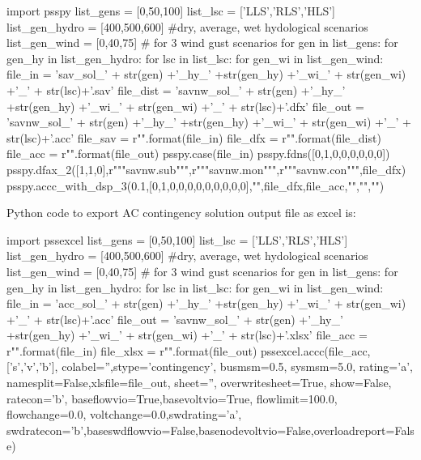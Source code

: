 \documentclass[10pt]{report}
\begin{document}
\begin{python}
import psspy
list_gens = [0,50,100]
list_lsc = ['LLS','RLS','HLS']
list_gen_hydro = [400,500,600] #dry, average, wet hydological scenarios
list_gen_wind = [0,40,75] # for 3 wind gust scenarios
for gen in list_gens:
    for gen_hy in list_gen_hydro:
        for lsc in list_lsc:
            for gen_wi in list_gen_wind:
                file_in = 'sav\savnw_sol_' + str(gen) +'_hy_' +str(gen_hy) +'_wi_' + str(gen_wi) +'_' + str(lsc)+'.sav'
                file_dist = 'savnw_sol_' + str(gen) +'_hy_' +str(gen_hy) +'_wi_' + str(gen_wi) +'_' + str(lsc)+'.dfx'
                file_out = 'savnw_sol_' + str(gen) +'_hy_' +str(gen_hy) +'_wi_' + str(gen_wi) +'_' + str(lsc)+'.acc'
                file_sav = r"{}".format(file_in)
                file_dfx = r"{}".format(file_dist)
                file_acc = r"{}".format(file_out)
                psspy.case(file_in)
                psspy.fdns([0,1,0,0,0,0,0,0])
                psspy.dfax_2([1,1,0],r"""savnw.sub""",r"""savnw.mon""",r"""savnw.con""",file_dfx)
                psspy.accc_with_dsp_3(0.1,[0,1,0,0,0,0,0,0,0,0,0],"",file_dfx,file_acc,"","","")
\end{python}



Python code to export AC contingency solution output file as excel is: 

\begin{python}
import pssexcel
list_gens = [0,50,100]
list_lsc = ['LLS','RLS','HLS']
list_gen_hydro = [400,500,600] #dry, average, wet hydological scenarios
list_gen_wind = [0,40,75] # for 3 wind gust scenarios
for gen in list_gens:
    for gen_hy in list_gen_hydro:
        for lsc in list_lsc:
            for gen_wi in list_gen_wind:
                file_in = 'acc\savnw_sol_' + str(gen) +'_hy_' +str(gen_hy) +'_wi_' + str(gen_wi) +'_' + str(lsc)+'.acc'
                file_out = 'savnw_sol_' + str(gen) +'_hy_' +str(gen_hy) +'_wi_' + str(gen_wi) +'_' + str(lsc)+'.xlsx'
                file_acc = r"{}".format(file_in)
                file_xlsx = r"{}".format(file_out)
                pssexcel.accc(file_acc, ['s','v','b'], colabel='',stype='contingency', busmsm=0.5, sysmsm=5.0,
                        rating='a', namesplit=False,xlsfile=file_out, sheet='', overwritesheet=True, show=False, ratecon='b',
                        baseflowvio=True,basevoltvio=True, flowlimit=100.0, flowchange=0.0, voltchange=0.0,swdrating='a',
                        swdratecon='b',baseswdflowvio=False,basenodevoltvio=False,overloadreport=False)
\end{python}
\end{document}
